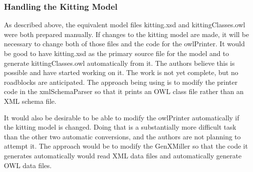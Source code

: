 \subsubsection{Handling the Kitting Model}
As described above, the equivalent model files kitting.xsd and
kittingClasses.owl were both prepared manually. If changes to the kitting
model are made, it will be necessary to change both of those files and the
code for the owlPrinter. It would be good to have kitting.xsd as the
primary source file for the model and to generate kittingClasses.owl
automatically from it. The authors believe this is possible and have
started working on it. The work is not yet complete, but no roadblocks are
anticipated. The approach being using is to modify the printer code in the
xmlSchemaParser so that it prints an OWL class file rather than an XML
schema file.

It would also be desirable to be able to modify the owlPrinter
automatically if the kitting model is changed. Doing that is a
substantially more difficult task than the other two automatic conversions,
and the authors are not planning to attempt it. The approach would be to
modify the GenXMiller so that the code it generates automatically would
read XML data files and automatically generate OWL data files.
